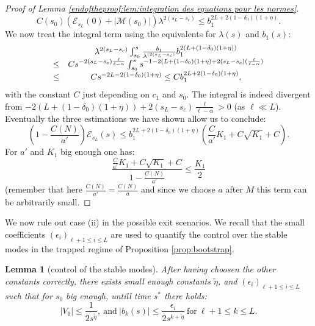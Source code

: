\documentclass[11pt,a4paper,reqno]{amsart}
\newtheorem{lemma}[theorem]{Lemma}
\theoremstyle{remark}
\numberwithin{equation}{section}
\begin{document}
\begin{proof}[ Proof of Lemma \ref{endoftheproof:lem:integration des equations pour les normes}]
$$
C(s_0)(\mathcal{E}_{s_L}(0)+|\mathcal{M}(s_0)|)\lambda^{2(s_L-s_c)}\leq b_1^{2L+2(1-\delta_0)(1+\eta)} .
$$
We now treat the integral term using the equivalents for $\lambda(s)$ and $b_1(s)$:
$$
\begin{array}{r c l}
&\lambda^{2(s_L-s_c)}\int_{s_0}^s \frac{b_1}{\lambda^{(2(s_L-s_c)}}b_1^{2(L+(1-\delta_0)(1+\eta))}\\
\leq & C s^{-2(s_L-s_c)\frac{\ell}{\ell-\alpha}}\int_{s_0}^s s^{-1-2(L+(1-\delta_0)(1+\eta)+2(s_L-s_c)(\frac{\ell}{\ell-\alpha})} \\
\leq & C s^{-2L-2(1-\delta_0)(1+\eta)} \leq  Cb_1^{2L+2(1-\delta_0)(1+\eta)} ,
\end{array}
$$
with the constant $C$ just depending on $c_1$ and $s_0$. The integral is indeed divergent from $-2(L+(1-\delta_0)(1+\eta))+2(s_L-s_c)\frac{\ell}{\ell-\alpha}>0 $ (as $\ell \ll L$). Eventually the three estimations we have shown allow us to conclude:
$$
\left(1-\frac{C(N)}{a'}\right)\mathcal{E}_{s_L}(s)\leq b_1^{2L+2(1-\delta_0)(1+\eta)}\left(\frac{C}{a'}K_1+C\sqrt{K_1}+C \right) .
$$
For $a'$ and $K_1$ big enough one has:
$$
\frac{\frac{C}{a'}K_1+C\sqrt{K_1}+C}{1-\frac{C(N)}{a'}}\leq \frac{K_1}{2} 
$$
(remember that here $\frac{C(N)}{a'}=\frac{C(N)}{a}$ and since we choose $a$ after $M$ this term can be arbitrarily small.
\end{proof}

We now rule out case (ii) in the possible exit scenarios. We recall that the small coefficients $(\epsilon_i)_{\ell+1\leq i \leq L}$ are used to quantify the control over the stable modes in the trapped regime of Proposition \ref{prop:bootstrap}.

\begin{lemma}[control of the stable modes]\label{endoftheproof:lem: controle des modes stables}
After having choosen the other constants correctly, there exists small enough constants $\tilde{\eta}$, and $(\epsilon_i)_{\ell+1\leq i \leq L}$ such that for $s_0$ big enough, untill time $s^*$ there holds:
\begin{equation}
|V_1|\leq \frac{1}{2s^{\tilde{\eta}}}, \ \text{and} \ |b_k(s)|\leq \frac{\epsilon_i}{2s^{k+\tilde{\eta}}} \ \text{for} \ \ell+1\leq k \leq L.
\end{equation}
\end{lemma}
\end{document}
